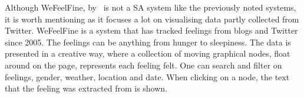 Although WeFeelFine, by~\cite{article:wefeelfine} is not a SA system like the previously noted systems, it is worth mentioning as it focuses a lot on visualising data partly collected from Twitter. WeFeelFine is a system that has tracked feelings from blogs and Twitter since 2005. The feelings can be anything from hunger to sleepiness. The data is presented in a creative way, where a collection of moving graphical nodes, float around on the page, represents each feeling felt. One can search and filter on feelings, gender, weather, location and date. When clicking on a node, the text that the feeling was extracted from is shown. 